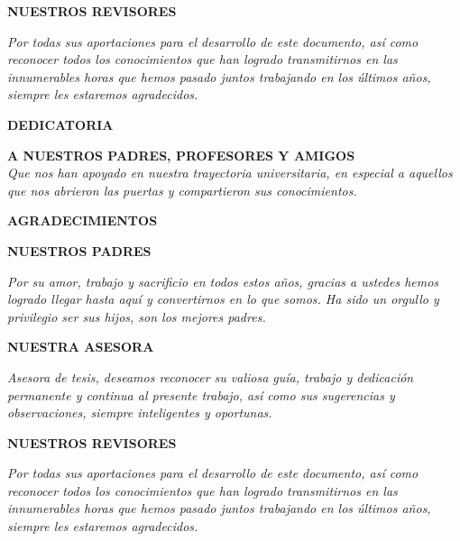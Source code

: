 {\flushright \textbf{NUESTROS REVISORES}\\}

\textit{Por todas sus aportaciones para el desarrollo de este documento, así como reconocer todos los conocimientos que han logrado transmitirnos en las innumerables horas que hemos pasado juntos trabajando en los últimos años, siempre les estaremos agradecidos.}
\newline
\vfill








\newpage
{\Large \textbf{DEDICATORIA}}
\thispagestyle{empty}
\vspace{2\parsep}


{\flushright \textbf{A NUESTROS PADRES, PROFESORES Y AMIGOS\\} }
\textit{Que nos han apoyado en nuestra trayectoria universitaria, en especial a aquellos que nos abrieron las puertas y compartieron sus conocimientos.}





\vspace{4cm}
{\Large \textbf{AGRADECIMIENTOS}}
\vspace{2\parsep}

{\flushright \textbf{NUESTROS PADRES}\\}

\textit{Por su amor, trabajo y sacrificio en todos estos años, gracias a ustedes hemos logrado llegar hasta aquí y convertirnos en lo que somos. Ha sido un orgullo y privilegio ser sus hijos, son los mejores padres.}
\newline

{\flushright \textbf{NUESTRA ASESORA\\}}

\textit{Asesora de tesis, deseamos reconocer su valiosa guía, trabajo y dedicación permanente y continua al presente trabajo, así como sus sugerencias y observaciones, siempre inteligentes y oportunas.}
\newline

{\flushright \textbf{NUESTROS REVISORES}\\}

\textit{Por todas sus aportaciones para el desarrollo de este documento, así como reconocer todos los conocimientos que han logrado transmitirnos en las innumerables horas que hemos pasado juntos trabajando en los últimos años, siempre les estaremos agradecidos.}
\newline
